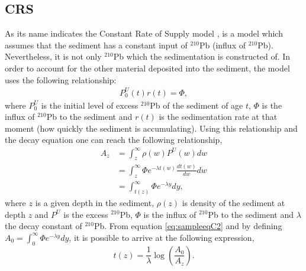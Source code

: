 \documentclass [10pt] {article}
\begin{document}



\subsection{CRS}


As its name indicates the Constant Rate of Supply model \citep{Appleby1978,Appleby1998,Appleby2001,Appleby2008}, is a model which assumes that the sediment has a constant input of $^{210}$Pb (influx of $^{210}$Pb). Nevertheless, it is not only $^{210}$Pb which the sedimentation is constructed of. In order to account for the other material deposited into the sediment, the model uses the following relationship:
\begin{eqnarray}
	P_0^U(t)r(t) = \Phi,
\end{eqnarray}
where $P_0^U$ is the initial level of excess $^{210}$Pb of the sediment of age $t$, $\Phi$ is the influx of $^{210}$Pb to the sediment and $r(t)$ is the sedimentation rate at that moment (how quickly the sediment is accumulating). Using this relationship and the decay equation one can reach the following relationship, 
\begin{eqnarray}
	A_{z}&=\int_{z}^{\infty}\rho(w)P^U(w)dw  \nonumber \\
	&=\int_{z}^{\infty} \Phi e^{- \lambda t(w) }\frac{dt(w)}{dw} dw \nonumber \\ 
	&=\int_{t(z)}^{\infty} \Phi e^{- \lambda y } dy,  \label{eq:sampleeqC2} 
\end{eqnarray}
where $z$ is a given depth in the sediment, $\rho(z)$ is density of the sediment at depth $z$ and $P^U$ is the excess $^{210}$Pb, $\Phi$ is the influx of $^{210}$Pb to the sediment and $\lambda$ the decay constant of $^{210}$Pb. From equation \ref{eq:sampleeqC2} and by defining $A_0=\int_{0}^{\infty} \Phi e^{- \lambda y } dy$, it is possible to arrive at the following expression,
\begin{equation}
	t(z)= \frac{1}{\lambda}\log\left(\frac{A_0}{A_{z}}\right). \label{eq:CRS}
\end{equation}
\end{document}
